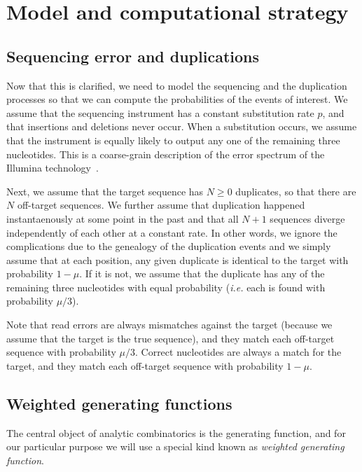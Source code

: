 \documentclass{article}
\begin{document}
\section{Model and computational strategy}
\label{sec:symbolic}

\subsection{Sequencing error and duplications}

Now that this is clarified, we need to model the sequencing and the
duplication processes so that we can compute the probabilities of the
events of interest. We assume that the sequencing instrument has a
constant substitution rate $p$, and that insertions and deletions never
occur. When a substitution occurs, we assume that the instrument is
equally likely to output any one of the remaining three nucleotides. This
is a coarse-grain description of the error spectrum of the Illumina
technology~\cite{pmid21576222}.

Next, we assume that the target sequence has $N \geq 0$ duplicates, so
that there are $N$ off-target sequences. We further assume that
duplication happened instantaenously at some point in the past and that
all $N+1$ sequences diverge independently of each other at a constant
rate. In other words, we ignore the complications due to the genealogy of
the duplication events and we simply assume that at each position, any
given duplicate is identical to the target with probability $1-\mu$. If it
is not, we assume that the duplicate has any of the remaining three
nucleotides with equal probability (\textit{i.e.} each is found with
probability $\mu/3$).

Note that read errors are always mismatches against the target (because we
assume that the target is the true sequence), and they match each
off-target sequence with probability $\mu/3$. Correct nucleotides are
always a match for the target, and they match each off-target sequence
with probability $1-\mu$.


\subsection{Weighted generating functions}

The central object of analytic combinatorics is the generating function,
and for our particular purpose we will use a special kind known as
\emph{weighted generating function}.
\end{document}
